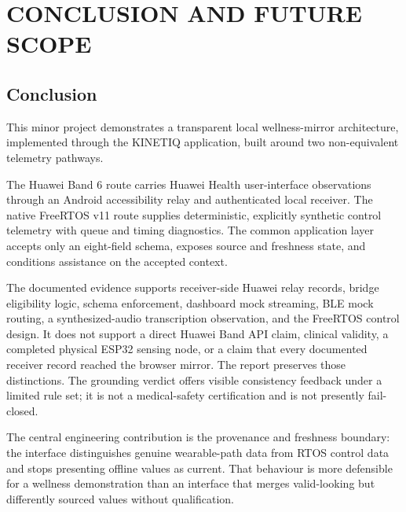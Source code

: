 \chapter{CONCLUSION AND FUTURE SCOPE}

\section{Conclusion}
This minor project demonstrates a transparent local wellness-mirror architecture, implemented through the KINETIQ application, built around two non-equivalent telemetry pathways.

The Huawei Band 6 route carries Huawei Health user-interface observations through an Android accessibility relay and authenticated local receiver. The native FreeRTOS v11 route supplies deterministic, explicitly synthetic control telemetry with queue and timing diagnostics. The common application layer accepts only an eight-field schema, exposes source and freshness state, and conditions assistance on the accepted context.

The documented evidence supports receiver-side Huawei relay records, bridge eligibility logic, schema enforcement, dashboard mock streaming, BLE mock routing, a synthesized-audio transcription observation, and the FreeRTOS control design. It does not support a direct Huawei Band API claim, clinical validity, a completed physical ESP32 sensing node, or a claim that every documented receiver record reached the browser mirror. The report preserves those distinctions. The grounding verdict offers visible consistency feedback under a limited rule set; it is not a medical-safety certification and is not presently fail-closed.

The central engineering contribution is the provenance and freshness boundary: the interface distinguishes genuine wearable-path data from RTOS control data and stops presenting offline values as current. That behaviour is more defensible for a wellness demonstration than an interface that merges valid-looking but differently sourced values without qualification.

